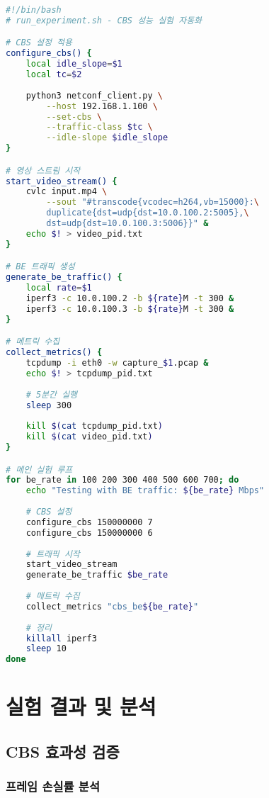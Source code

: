\documentclass[twocolumn,10pt]{article}
\begin{document}
\begin{lstlisting}[language=bash, caption=실험 자동화 스크립트]
#!/bin/bash
# run_experiment.sh - CBS 성능 실험 자동화

# CBS 설정 적용
configure_cbs() {
    local idle_slope=$1
    local tc=$2
    
    python3 netconf_client.py \
        --host 192.168.1.100 \
        --set-cbs \
        --traffic-class $tc \
        --idle-slope $idle_slope
}

# 영상 스트림 시작
start_video_stream() {
    cvlc input.mp4 \
        --sout "#transcode{vcodec=h264,vb=15000}:\
        duplicate{dst=udp{dst=10.0.100.2:5005},\
        dst=udp{dst=10.0.100.3:5006}}" &
    echo $! > video_pid.txt
}

# BE 트래픽 생성
generate_be_traffic() {
    local rate=$1
    iperf3 -c 10.0.100.2 -b ${rate}M -t 300 &
    iperf3 -c 10.0.100.3 -b ${rate}M -t 300 &
}

# 메트릭 수집
collect_metrics() {
    tcpdump -i eth0 -w capture_$1.pcap &
    echo $! > tcpdump_pid.txt
    
    # 5분간 실행
    sleep 300
    
    kill $(cat tcpdump_pid.txt)
    kill $(cat video_pid.txt)
}

# 메인 실험 루프
for be_rate in 100 200 300 400 500 600 700; do
    echo "Testing with BE traffic: ${be_rate} Mbps"
    
    # CBS 설정
    configure_cbs 150000000 7
    configure_cbs 150000000 6
    
    # 트래픽 시작
    start_video_stream
    generate_be_traffic $be_rate
    
    # 메트릭 수집
    collect_metrics "cbs_be${be_rate}"
    
    # 정리
    killall iperf3
    sleep 10
done
\end{lstlisting}

\section{실험 결과 및 분석}
\label{sec:results}

\subsection{CBS 효과성 검증}

\subsubsection{프레임 손실률 분석}
\end{document}
